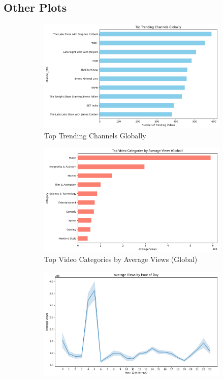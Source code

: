\documentclass[a4paper]{article}
\begin{document}
\subsection{Other Plots}
\begin{figure}[h]
    \centering
    \begin{subfigure}{0.3\textwidth}
        \includegraphics[width=\linewidth]{other1.png}
        \caption{Top Trending Channels Globally}
        \label{fig:sub1}
    \end{subfigure}
    \hfill
    \begin{subfigure}{0.3\textwidth}
        \includegraphics[width=\linewidth]{other2.png}
        \caption{Top Video Categories by Average Views (Global)}
        \label{fig:sub2}
    \end{subfigure}
    \hfill
    \begin{subfigure}{0.3\textwidth}
        \includegraphics[width=\linewidth]{other3.png}

\end{subfigure}
\end{figure}
\end{document}
